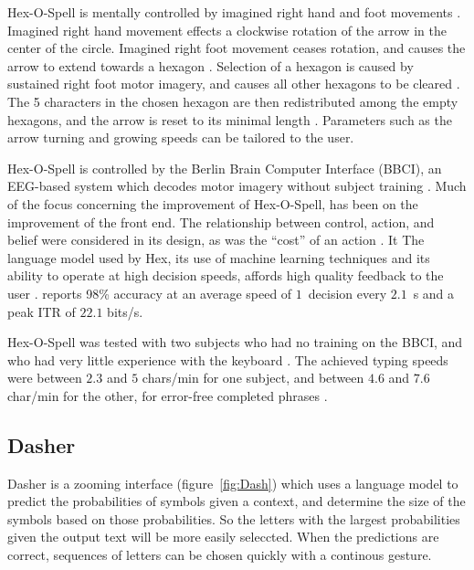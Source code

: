 \documentclass[12pt,titlepage]{article}
\begin{document}
Hex-O-Spell is mentally controlled by imagined right hand and foot movements \cite{blankertz_advanced}.  Imagined right 
hand movement effects a clockwise rotation of the arrow in the center of the circle.  Imagined right foot 
movement ceases rotation, and causes the arrow to extend towards a hexagon \cite{williamson_designing_2009}.  Selection of a 
hexagon is caused by sustained right foot motor imagery, and causes all other hexagons to be 
cleared \cite{williamson_designing_2009}.  The 5 characters in the chosen hexagon are then redistributed among the empty hexagons, 
and the arrow is reset to its minimal length \cite{williamson_designing_2009}.  Parameters such as the arrow turning and growing 
speeds can be tailored to the user.

Hex-O-Spell is controlled by the Berlin Brain Computer Interface (BBCI), an EEG-based
system which decodes motor imagery without subject training \cite{schalk_bci2000:general-purpose_2004}.  Much of the  focus 
concerning the improvement of Hex-O-Spell, has been on the improvement of the front end.  The 
relationship between control, action, and belief were considered in its design, as was the ``cost'' of an 
action \cite{williamson_designing_2009}.  It The language model used by Hex, its use of machine learning techniques and its ability to 
operate at high decision speeds, affords high quality feedback to the user \cite{blankertz_advanced}. \cite{blankertz_advanced} reports 98\% accuracy at 
an average speed of $1$~decision every  $2.1$~s and a peak ITR of $22.1$ bits/s.

Hex-O-Spell was tested with two subjects who had no training on the BBCI, and who had very little 
experience with the keyboard \cite{blankertz_berlin_2006}.  The achieved typing speeds were between $2.3$ and $5$ chars/min for 
one subject, and between $4.6$ and $7.6$ char/min for the other, for error-free completed phrases \cite{blankertz_berlin_2006}.

\subsection{Dasher}

Dasher is a zooming interface (figure~\ref{fig:Dash}) which uses a language model to predict the probabilities of 
symbols given a context, and determine the size of the symbols based on those probabilities.  So the 
letters with the largest probabilities given the output text will be more easily seleccted.  When the 
predictions are correct, sequences of letters can be chosen quickly with a continous gesture.
\end{document}
